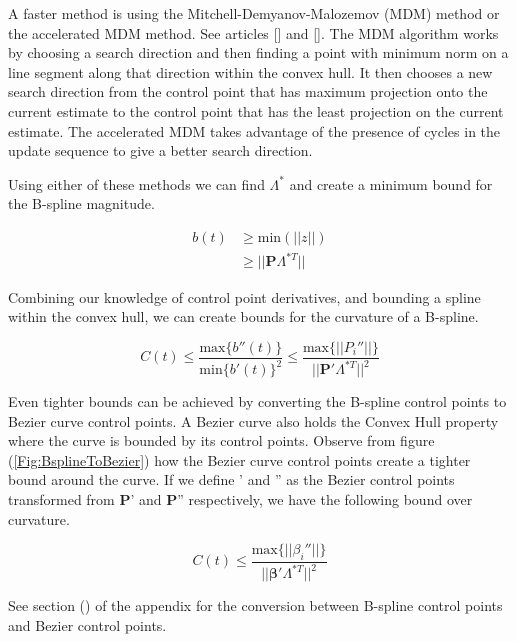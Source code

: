 \documentclass{article}
\begin{document}
A faster method is using the Mitchell-Demyanov-Malozemov (MDM) method or the accelerated MDM method. See articles [] and []. The MDM algorithm works by choosing a search direction and then finding a point with minimum norm on a line segment along that direction within the convex hull. It then chooses a new search direction from the control point that has maximum projection onto the current estimate to the control point that has the least projection on the current estimate. The accelerated MDM takes advantage of the presence of cycles in the update sequence to give a better search direction.

Using either of these methods we can find \(\Lambda^*\) and create a minimum bound for the B-spline magnitude.

\begin{equation}
\begin{aligned}
    b(t) & \geq \text{min}(||z||) \\
    & \geq ||\textbf{P} \Lambda^{*T}||
\end{aligned}
\end{equation}

Combining our knowledge of control point derivatives, and bounding a spline within the convex hull, we can create bounds for the curvature of a B-spline.

\begin{equation}
    C(t) \leq \frac{\text{max}\{b''(t)\}}{\text{min}\{b'(t)\}^2} \leq \frac{\text{max}\{||P_i''||\}}{||\textbf{P}' \Lambda^{*T}||^2}
\end{equation}

Even tighter bounds can be achieved by converting the B-spline control points to Bezier curve control points. A Bezier curve also holds the Convex Hull property where the curve is bounded by its control points. Observe from figure (\ref{Fig:BsplineToBezier}) how the Bezier curve control points create a tighter bound around the curve. If we define \boldsymbol{\beta}' and \boldsymbol{\beta}'' as the Bezier control points  transformed from \textbf{P}' and \textbf{P}'' respectively, we have the following bound over curvature.

\begin{equation}
    C(t) \leq \frac{\text{max}\{||\beta_i''||\}}{||\boldsymbol{\beta}' \Lambda^{*T}||^2}
\end{equation}

See section () of the appendix for the conversion between B-spline control points and Bezier control points.
\end{document}
